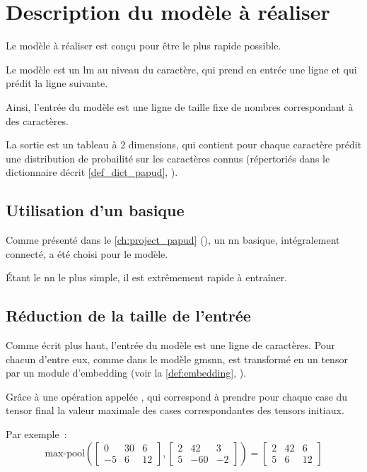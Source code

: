 \chapter{Description du modèle à réaliser}\label{ch:papud_model}
Le modèle à réaliser est conçu pour être le plus rapide possible.

Le modèle est un \gls{lm} au niveau du caractère, qui prend en entrée une ligne et qui prédit la ligne suivante.

Ainsi, l'entrée du modèle est une ligne de taille fixe de nombres correspondant à des caractères.

La sortie est un tableau à 2 dimensions, qui contient pour chaque caractère prédit une distribution de probailité sur les caractères connus (répertoriés dans le dictionnaire décrit \autoref{def_dict_papud}, ).

\section{Utilisation d'un  basique}
Comme présenté dans le \autoref{ch:project_papud} (), un \gls{nn} basique, intégralement connecté, a été choisi pour le modèle.

Étant le \gls{nn} le plus simple, il est extrêmement rapide à entraîner.

\section{Réduction de la taille de l'entrée}
Comme écrit plus haut, l'entrée du modèle est une ligne de caractères.
Pour chacun d'entre eux, comme dans le modèle \gls{gmsnn}, est transformé en un \gls{tensor} par un module d'\gls{embedding} (voir la \autoref{def:embedding}, ).

Grâce à une opération appelée \og {} \fg{}, qui correspond à prendre pour chaque case du \gls{tensor} final la valeur maximale des cases correspondantes des \glspl{tensor} initiaux.

Par exemple~:
\[ \text{max-pool}\left(\left[\begin{array}{ccc}0&30&6\\-5&6&12\end{array}\right] , \left[ \begin{array}{ccc}2&42&3\\5&-60&-2\end{array}\right] \right) = \left[\begin{array}{ccc}2&42&6\\5&6&12\end{array}\right]  \]

